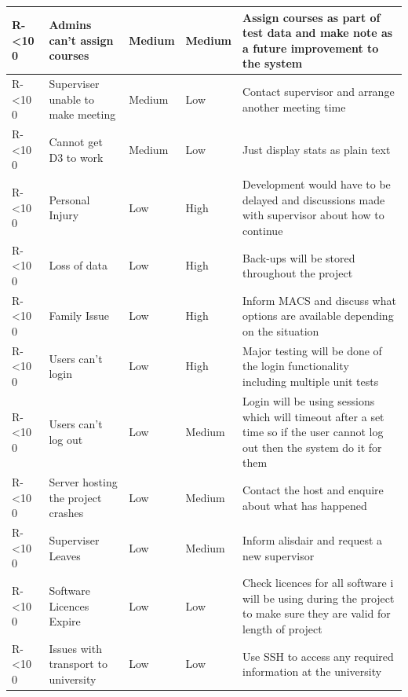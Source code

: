 \documentclass[12pt]{article}  %
\newcommand{\rid}[1]{\centering #1-\ifnum\value{requirement}<10 0\fi\arabic{requirement} \stepcounter{requirement}}
\begin{document}
\begin{spacing}{1.2}
\begin{longtable}{|p{}|p{}|p{}|p{}|p{}|}
\rid{R} & Admins can’t assign courses & Medium & Medium & Assign courses as part of test data and make note as a future improvement to the system  \\ \hline

\rid{R} & Superviser unable to make meeting & Medium & Low & Contact supervisor and arrange another meeting time \\ \hline

\rid{R} & Cannot get D3 to work & Medium & Low & Just display stats as plain text\\ \hline



\rid{R} & Personal Injury & Low & High & Development would have to be delayed and discussions made with supervisor about how to continue\\ \hline

\rid{R} & Loss of data & Low & High & Back-ups will be stored throughout the project\\
\hline

\rid{R} & Family Issue & Low & High  & Inform MACS and discuss what options are available depending on the situation \\ \hline

\rid{R} & Users can't login & Low & High & Major testing will be done of the login functionality including multiple unit tests\\ \hline

\rid{R} & Users can't log out & Low & Medium & Login will be using sessions which will timeout after a set time so if the user cannot log out then the system do it for them\\ \hline

\rid{R} & Server hosting the project crashes & Low & Medium & Contact the host and enquire about what has happened\\ \hline

\rid{R} & Superviser Leaves & Low & Medium & Inform alisdair and request a new supervisor\\ \hline

\rid{R} & Software Licences Expire & Low & Low & Check licences for all software i will be using during the project to make sure they are valid for length of project\\ \hline

\rid{R} & Issues with transport to university  & Low & Low & Use SSH to access any required information at the university  \\ \hline

\end{longtable}
\end{spacing}
\end{document}
